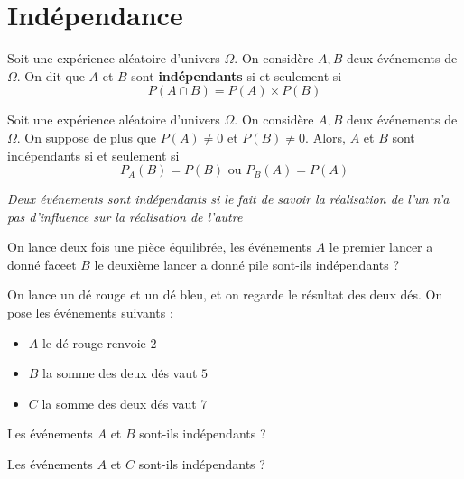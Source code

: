 \documentclass{article}
\begin{document}
\section{Indépendance}
\begin{tcolorbox}
\begin{definition}
Soit une expérience aléatoire d'univers $\Omega$. On considère $A, B$ deux événements de $\Omega$. On dit que $A$ et $B$ sont \textbf{indépendants} si et seulement si
\begin{equation*}
P(A \cap B) = P(A) \times P(B)
\end{equation*}
\end{definition}
\end{tcolorbox}
\begin{proposition}
Soit une expérience aléatoire d'univers $\Omega$. On considère $A, B$ deux événements de $\Omega$. On suppose de plus que $P(A) \neq 0$ et $P(B) \neq 0$. Alors, $A$ et $B$ sont indépendants si et seulement si
\begin{equation*}
P_A(B) = P(B) \text{ ou } P_B(A)=P(A)
\end{equation*}
\end{proposition}
\begin{remark}
\emph{Deux événements sont indépendants si le fait de savoir la réalisation de l'un n'a pas d'influence sur la réalisation de l'autre} 
\end{remark}
\begin{example}
On lance deux fois une pièce équilibrée, les événements $A$ \og le premier lancer a donné face\fg et $B$ \og le deuxième lancer a donné pile \fg sont-ils indépendants ?
\vspace*{0.5cm}

\emptybox{2cm}

On lance un dé rouge et un dé bleu, et on regarde le résultat des deux dés. On pose les événements suivants :
\begin{itemize}
\item $A$ \og le dé rouge renvoie $2$ \fg
\item $B$ \og la somme des deux dés vaut $5$ \fg
\item $C$ \og la somme des deux dés vaut $7$ \fg
\end{itemize}
\begin{enumquestions}
\item Les événements $A$ et $B$ sont-ils indépendants ?
\item Les événements $A$ et $C$ sont-ils indépendants ?
\end{enumquestions}
\vspace*{0.5cm}

\emptybox{5cm}
\end{example}
\end{document}
